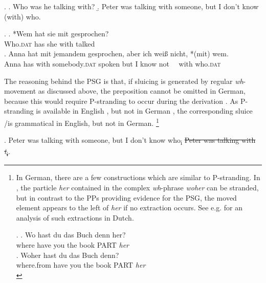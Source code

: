 \ex.
\a. Who was he talking with? \label{pst-english-question}\hfill \citep[666]{merchant2004}
\b. Peter was talking with someone, but I don’t know (with) who.

\ex. 
\ag. *Wem hat sie mit gesprochen?\label{ex:pst-german-q}\\
Who.\textsc{dat} has she with talked\\
\bg. Anna hat mit jemandem gesprochen, aber ich wei\ss {} nicht, *(mit) wem. \hfill\\
Anna has with somebody.\textsc{dat} spoken but I know not \mbox{~~}with who.\textsc{dat}\\

The reasoning behind the PSG is that, if sluicing is generated by regular \textit{wh}-movement as discussed above, the preposition cannot be omitted in German, because this would require P-stranding to occur during the derivation \Next. As P-stranding is available in English \LLast[a], but not in German \Last[a], the corresponding sluice \LLast[b]/\Last[b] is grammatical in English, but not in German.%
%
\footnote{In German, there are a few constructions which are similar to P-stranding. In \Next, the particle \textit{her} contained in the complex \textit{wh}-phrase \textit{woher} can be stranded, but in contrast to the PPs providing evidence for the PSG, the moved element appears to the left of \textit{her} if no extraction occurs. See e.g. \citet{vanriemsdijk1978} for an analysis of such extractions in Dutch.

\ex. \ag. Wo hast du das Buch denn her?\\
	  where have you the book PART \textit{her}\\ 
\bg. Woher hast du das Buch denn?\\
	  where.from have you the book PART \textit{her}\\ 

}\afterfn%
%

\ex. Peter was talking with someone, but I don't know who\textsubscript{i} \sout{Peter was talking with \textit{t}\textsubscript{i}}.

